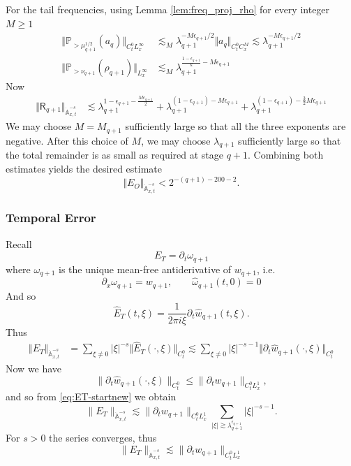 \documentclass[12pt,reqno,letterpaper]{amsart}
\numberwithin{equation}{section}
\newcommand{\1}{{\bf 1}}
\newcommand{\2}{{\bf 2}}
\renewcommand{\P}{\mathbb{P}}
\newcommand{\norm}[1]{ \Vert #1 \Vert}
\theoremstyle{remark}
\theoremstyle{remark}
\begin{document}
For the tail frequencies, using Lemma \ref{lem:freq_proj_rho} for every integer $M \geq 1$
\begin{align*}
    \norm{\P_{> \mu_{q+1}^{1/2}}(a_q)}_{C_t^0 L_x^\infty} &\lesssim_M \lambda_{q+1}^{-M \epsilon_{q+1}/2} \norm{a_q}_{C_t^0 C_x^M} \lesssim  \lambda_{q+1}^{-M \epsilon_{q+1}/2}\\
     \norm{\P_{> \nu_{q+1}}(\rho_{q+1})}_{L_x^\infty}&\lesssim_M \lambda_{q+1}^{\frac{1-\epsilon_{q+1}}{k}-M \epsilon_{q+1}} 
\end{align*}
Now 
\begin{align*}
      \norm{\mathsf{R}_{q+1}}_{\dot{\mathbb{A}}_{x,t}^{-s}} &\lesssim \lambda_{q+1}^{1 - \epsilon_{q+1} - \frac{M\epsilon_{q+1}}{2}} + \lambda_{q+1}^{(1 - \epsilon_{q+1}) -M\epsilon_{q+1}} + \lambda_{q+1}^{(1- \epsilon_{q+1}) - \frac32 M \epsilon_{q+1}} 
\end{align*}
We may choose $M = M_{q+1}$ sufficiently large so that all the three exponents are negative. After this choice of $M$, we may choose $\lambda_{q+1}$ sufficiently large so that the total remainder is as small as required at stage $q+1$. Combining both estimates yields the desired estimate 
\begin{equation}\label{eq:EO-decay}
    \norm{E_O}_{\dot{\mathbb{A}}_{x,t}^{-s}}
    < 2^{-(q+1) - 200 - 2} .
\end{equation}



\subsubsection*{Temporal Error}

Recall 
\[E_T = \partial_t \omega_{q+1}\] where $\omega_{q+1}$ is the unique mean-free antiderivative of $w_{q+1}$, i.e.
\[\partial_x \omega_{q+1} = w_{q+1}, \qquad \hat{\omega}_{q+1}(t,0) = 0\]
And so
\begin{equation*}
    \hat{E}_T(t, \xi) = \frac{1}{2\pi i \xi} \partial_t \hat{w}_{q+1}(t, \xi).
\end{equation*}
Thus 
\begin{align}\label{eq:ET-startnew}
    \norm{E_T}_{\dot{\mathbb{A}}_{x,t}^{-s}} &= \sum_{\xi \neq 0}|\xi|^{-s} \norm{\hat{E}_T(\cdot, \xi)}_{C_t^0} \lesssim \sum_{\xi \neq 0} |\xi|^{-s - 1}\norm{\partial_t \hat{w}_{q+1}(\cdot, \xi)}_{C_t^0}
\end{align}
Now we have
\[
\|\partial_t\hat{w}_{q+1}(\cdot,\xi)\|_{C_t^0}
\le
\|\partial_t w_{q+1}\|_{C_t^0L_x^1},
\]
and so from \eqref{eq:ET-startnew} we obtain
\[
\|E_T\|_{\dot{\mathbb{A}}_{x,t}^{-s}}
\lesssim
\|\partial_t w_{q+1}\|_{C_t^0L_x^1}
\sum_{|\xi|\gtrsim \lambda_{q+1}^{\epsilon_{q+1}}} |\xi|^{-s-1}.
\]
For $s >0$ the series converges, thus
\begin{equation}
    \|E_T\|_{\dot{\mathbb{A}}_{x,t}^{-s}}
\lesssim  \|\partial_t w_{q+1}\|_{C_t^0L_x^1} \label{eq:ET-pre-dtwnew}
\end{equation}
\end{document}
